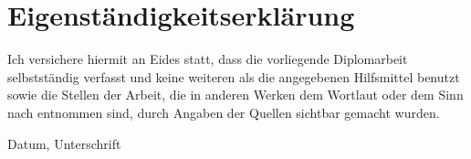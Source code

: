 \section*{Eigenst\"andigkeitserkl\"arung}

Ich versichere hiermit an Eides statt, dass die vorliegende Diplomarbeit
selbstständig verfasst und keine weiteren als die angegebenen Hilfsmittel
benutzt sowie die Stellen der Arbeit, die in anderen Werken dem Wortlaut oder
dem Sinn nach entnommen sind, durch Angaben der Quellen sichtbar gemacht
wurden.

\vspace{4em}

\parbox[t]{0.3\textwidth}{\dotfill}

Datum, Unterschrift
